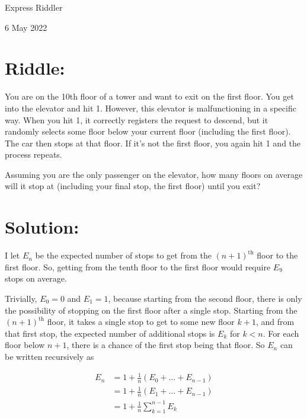 \documentclass{article}
\begin{document}
\pagestyle{empty} %

\begin{center}
{\LARGE Express Riddler}

\vspace{0.15in}

{\Large 6 May 2022}
\end{center}


\section*{Riddle:}

You are on the 10th floor of a tower and want to exit on the first floor.
You get into the elevator and hit 1.
However, this elevator is malfunctioning in a specific way.
When you hit 1, it correctly registers the request to descend, but it randomly selects some floor below your current floor (including the first floor).
The car then stops at that floor.
If it's not the first floor, you again hit 1 and the process repeats.

Assuming you are the only passenger on the elevator, how many floors on average will it stop at (including your final stop, the first floor) until you exit?


\section*{Solution:}

I let $E_{n}$ be the expected number of stops to get from the $(n+1)^{\textrm{th}}$ floor to the first floor.
So, getting from the tenth floor to the first floor would require $E_{9}$ stops on average.

Trivially, $E_{0}=0$ and $E_{1}=1$, because starting from the second floor, there is only the possibility of stopping on the first floor after a single stop.
Starting from the $(n+1)^{\textrm{th}}$ floor, it takes a single stop to get to some new floor $k+1$, and from that first stop, the expected number of additional stops is $E_{k}$ for $k<n$.
For each floor below $n+1$, there is a  chance of the first stop being that floor.
So $E_{n}$ can be written recursively as

\begin{align*}
E_{n} &= 1+\frac{1}{n}(E_{0}+\dots+E_{n-1}) \\
        &= 1+\frac{1}{n}(E_{1}+\dots+E_{n-1}) \\
        &= 1+\frac{1}{n}\sum_{k=1}^{n-1}E_{k}
\end{align*}
\end{document}

